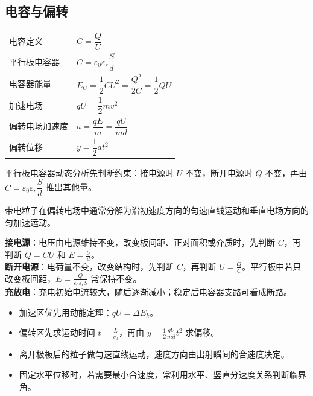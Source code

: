 
\subsection{电容与偏转}

\begin{tabularx}{\columnwidth}{XX}
  电容定义&$C=\dfrac{Q}{U}$\\
  平行板电容器&$C=\varepsilon_0\varepsilon_r\dfrac{S}{d}$\\
  电容器能量&$E_C=\dfrac12CU^2=\dfrac{Q^2}{2C}=\dfrac12QU$\\
  加速电场&$qU=\dfrac12mv^2$\\
  偏转电场加速度&$a=\dfrac{qE}{m}=\dfrac{qU}{md}$\\
  偏转位移&$y=\dfrac12at^2$\\
\end{tabularx}

\begin{formulanotebox}
平行板电容器动态分析先判断约束：接电源时 $U$ 不变，断开电源时 $Q$ 不变，再由 $C=\varepsilon_0\varepsilon_r\dfrac{S}{d}$ 推出其他量。

带电粒子在偏转电场中通常分解为沿初速度方向的匀速直线运动和垂直电场方向的匀加速运动。
\end{formulanotebox}

\begin{keypointbox}[title={\strut\textcolor{white}{\bfseries 重点知识点：电容器动态分析}}]
\textbf{接电源}：电压由电源维持不变，改变板间距、正对面积或介质时，先判断 $C$，再判断 $Q=CU$ 和 $E=\frac{U}{d}$。\\

\textbf{断开电源}：电荷量不变，改变结构时，先判断 $C$，再判断 $U=\frac{Q}{C}$。平行板中若只改变板间距，$E=\frac{Q}{\varepsilon_0\varepsilon_r S}$ 常保持不变。\\

\textbf{充放电}：充电初始电流较大，随后逐渐减小；稳定后电容器支路可看成断路。
\end{keypointbox}

\begin{casetypebox}[title={\strut\textcolor{white}{\bfseries 常见题型：电场加速与偏转}}]
\begin{itemize}[leftmargin=1.5em]
  \item 加速区优先用动能定理：$qU=\Delta E_k$。
  \item 偏转区先求运动时间 $t=\frac{L}{v_0}$，再由 $y=\frac12\frac{qU}{md}t^2$ 求偏移。
  \item 离开极板后的粒子做匀速直线运动，速度方向由出射瞬间的合速度决定。
  \item 固定水平位移时，若需要最小合速度，常利用水平、竖直分速度关系判断临界角。
\end{itemize}
\end{casetypebox}
